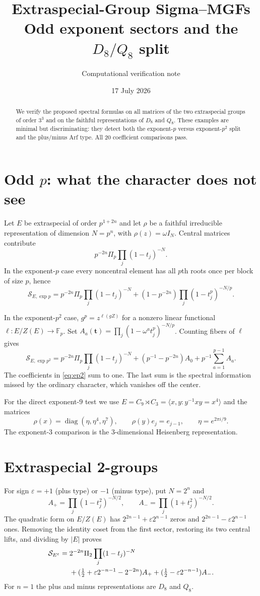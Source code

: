 \documentclass[11pt]{article}
\title{\color{navy}\bfseries Extraspecial-Group Sigma--MGFs\\\large Odd exponent sectors and the $D_8/Q_8$ split}
\author{Computational verification note}\date{17 July 2026}
\newcommand{\Sgm}{\mathcal S}
\begin{document}
\maketitle
\begin{abstract}
We verify the proposed spectral formulas on all matrices of the two
extraspecial groups of order $3^3$ and on the faithful representations of
$D_8$ and $Q_8$.  These examples are minimal but discriminating: they detect
both the exponent-$p$ versus exponent-$p^2$ split and the plus/minus Arf type.
All 20 coefficient comparisons pass.
\end{abstract}

\section{Odd $p$: what the character does not see}
Let $E$ be extraspecial of order $p^{1+2n}$ and let $\rho$ be a faithful
irreducible representation of dimension $N=p^n$, with
$\rho(z)=\omega I_N$.  Central matrices contribute
\[
p^{-2n}\Pi_p\prod_j(1-t_j)^{-N}.
\]
In the exponent-$p$ case every noncentral element has all $p$th roots once
per block of size $p$, hence
\begin{equation}\label{eq:ep}
\Sgm_{E,\exp p}=p^{-2n}\Pi_p\prod_j(1-t_j)^{-N}
+(1-p^{-2n})\prod_j(1-t_j^p)^{-N/p}.
\end{equation}

In the exponent-$p^2$ case, $g^p=z^{\ell(gZ)}$ for a nonzero linear
functional $\ell:E/Z(E)\to\mathbb F_p$.  Set
$A_a(\mathbf t)=\prod_j(1-\omega^at_j^p)^{-N/p}$.  Counting fibers of
$\ell$ gives
\begin{equation}\label{eq:ep2}
\Sgm_{E,\exp p^2}=p^{-2n}\Pi_p\prod_j(1-t_j)^{-N}
+(p^{-1}-p^{-2n})A_0+p^{-1}\sum_{a=1}^{p-1}A_a.
\end{equation}
The coefficients in \eqref{eq:ep2} sum to one.  The last sum is the spectral
information missed by the ordinary character, which vanishes off the center.

For the direct exponent-$9$ test we use
$E=C_9\rtimes C_3=\langle x,y:y^{-1}xy=x^4\rangle$ and the matrices
\[
\rho(x)=\operatorname{diag}(\eta,\eta^4,\eta^7),\qquad
\rho(y)e_j=e_{j-1},\qquad \eta=e^{2\pi i/9}.
\]
The exponent-$3$ comparison is the $3$-dimensional Heisenberg representation.

\section{Extraspecial 2-groups}
For sign $\varepsilon=+1$ (plus type) or $-1$ (minus type), put $N=2^n$ and
\[
A_+=\prod_j(1-t_j^2)^{-N/2},\qquad
A_-=\prod_j(1+t_j^2)^{-N/2}.
\]
The quadratic form on $E/Z(E)$ has
$2^{2n-1}+\varepsilon2^{n-1}$ zeros and
$2^{2n-1}-\varepsilon2^{n-1}$ ones.  Removing the identity coset from the
first sector, restoring its two central lifts, and dividing by $|E|$ proves
\begin{align}\label{eq:e2}
\Sgm_{E^\varepsilon}={}&2^{-2n}\Pi_2\prod_j(1-t_j)^{-N}\notag\\
&+(\tfrac12+\varepsilon2^{-n-1}-2^{-2n})A_+
+(\tfrac12-\varepsilon2^{-n-1})A_-.
\end{align}
For $n=1$ the plus and minus representations are $D_8$ and $Q_8$.
\end{document}
